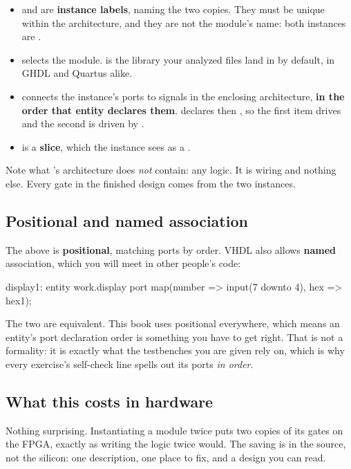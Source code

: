 \begin{itemize}
  \item {} and  are \textbf{instance labels}, naming the two copies.
    They must be unique within the architecture, and they are not the module's name: both instances
    are .
  \item {} selects the module.  is the library your analyzed
    files land in by default, in GHDL and Quartus alike.
  \item {} connects the instance's ports to signals in the enclosing architecture,
    \textbf{in the order that entity declares them}.  declares  then
    , so the first item drives  and the second is driven by .
  \item {} is a \textbf{slice}, which the instance sees as a
    .
\end{itemize}
Note what 's architecture does \emph{not} contain: any logic. It is wiring and
nothing else. Every gate in the finished design comes from the two  instances.

\subsection{Positional and named association}
\label{c2:association}
The  above is \textbf{positional}, matching ports by order. VHDL also allows
\textbf{named} association, which you will meet in other people's code:

\begin{vhdlcode}
display1: entity work.display
    port map(number => input(7 downto 4), hex => hex1);
\end{vhdlcode}

\noindent The two are equivalent. This book uses positional everywhere, which means an entity's port
declaration order is something you have to get right. That is not a formality: it is exactly what
the testbenches you are given rely on, which is why every exercise's self-check line spells out its
ports \emph{in order}.

\subsection{What this costs in hardware}
\label{c2:cost}
Nothing surprising. Instantiating a module twice puts two copies of its gates on the FPGA, exactly
as writing the logic twice would. The saving is in the source, not the silicon: one description, one
place to fix, and a design you can read.

